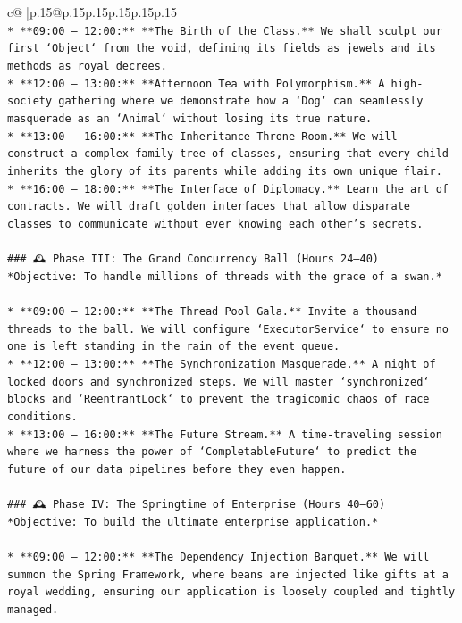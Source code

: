 \documentclass{article}
\begin{document}
{\begin{supertabular}{c@{$\;$}|p{.15\linewidth}@{}p{.15\linewidth}p{.15\linewidth}p{.15\linewidth}p{.15\linewidth}p{.15\linewidth}}
{{{\\ 
\texttt{*   **09:00 – 12:00:** **The Birth of the Class.** We shall sculpt our first `Object` from the void, defining its fields as jewels and its methods as royal decrees.} \\
\texttt{*   **12:00 – 13:00:** **Afternoon Tea with Polymorphism.** A high{-}society gathering where we demonstrate how a `Dog` can seamlessly masquerade as an `Animal` without losing its true nature.} \\
\texttt{*   **13:00 – 16:00:** **The Inheritance Throne Room.** We will construct a complex family tree of classes, ensuring that every child inherits the glory of its parents while adding its own unique flair.} \\
\texttt{*   **16:00 – 18:00:** **The Interface of Diplomacy.** Learn the art of contracts. We will draft golden interfaces that allow disparate classes to communicate without ever knowing each other's secrets.} \\
\\ 
\texttt{\#\#\# 🕰️ Phase III: The Grand Concurrency Ball (Hours 24–40)} \\
\texttt{*Objective: To handle millions of threads with the grace of a swan.*} \\
\\ 
\texttt{*   **09:00 – 12:00:** **The Thread Pool Gala.** Invite a thousand threads to the ball. We will configure `ExecutorService` to ensure no one is left standing in the rain of the event queue.} \\
\texttt{*   **12:00 – 13:00:** **The Synchronization Masquerade.** A night of locked doors and synchronized steps. We will master `synchronized` blocks and `ReentrantLock` to prevent the tragicomic chaos of race conditions.} \\
\texttt{*   **13:00 – 16:00:** **The Future Stream.** A time{-}traveling session where we harness the power of `CompletableFuture` to predict the future of our data pipelines before they even happen.} \\
\\ 
\texttt{\#\#\# 🕰️ Phase IV: The Springtime of Enterprise (Hours 40–60)} \\
\texttt{*Objective: To build the ultimate enterprise application.*} \\
\\ 
\texttt{*   **09:00 – 12:00:** **The Dependency Injection Banquet.** We will summon the Spring Framework, where beans are injected like gifts at a royal wedding, ensuring our application is loosely coupled and tightly managed.} \\
}}}
\end{supertabular}}
\end{document}
